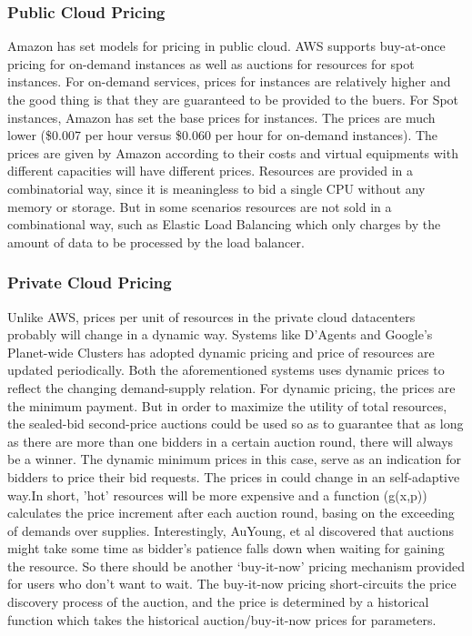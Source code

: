 \documentclass[a4paper,11pt,twocolumn]{article}
\begin{document}
\subsubsection{Public Cloud Pricing}
Amazon\cite{aws} has set models for pricing in public cloud. AWS supports buy-at-once pricing for on-demand instances as well as auctions for resources
for spot instances. For on-demand services, prices for instances are relatively higher and the good thing is that they are guaranteed to be provided to the buers.
For Spot instances\cite{spot}, Amazon has set the base prices for instances. The prices are much lower (\$0.007 per hour versus \$0.060 per hour for on-demand instances).
The prices are given by Amazon according to their costs and virtual equipments with different capacities will have different prices. Resources
are provided in a combinatorial way, since it is meaningless to bid a single CPU without any memory or storage. But in some scenarios resources are not 
sold in a combinational way, such as Elastic Load Balancing which only charges by the amount of data to be processed by the load balancer.
\subsubsection{Private Cloud Pricing}
Unlike AWS, prices per unit of resources in the private cloud datacenters probably will change in a dynamic way.  Systems like D'Agents\cite{dartmouth} and Google's Planet-wide 
Clusters\cite{google} has adopted dynamic pricing and price of resources are updated periodically. Both the aforementioned systems uses dynamic prices to 
reflect the changing demand-supply relation. For dynamic pricing, the prices are the minimum payment. But in order to maximize the utility of total resources,
the sealed-bid second-price auctions \cite{second price} could be used so as to guarantee that as long as there are more than one bidders in a certain auction round, 
there will always be a winner. The dynamic minimum prices in this case, serve as an indication for bidders to price their bid requests. The prices in \cite{google} could 
change in an self-adaptive way.In short, 'hot' resources will be more expensive and a function (g(x,p)) calculates the price increment after each auction round, basing on the 
exceeding of demands over supplies. Interestingly, AuYoung, et al \cite{ucsd} discovered that auctions might take some time as bidder's patience falls down
when waiting for gaining the resource. So there should be another `buy-it-now' pricing mechanism provided for users who don't want to wait. The buy-it-now
pricing short-circuits the price discovery process of the auction, and the price is determined by a historical function which takes the historical auction/buy-it-now
prices for parameters.
\end{document}
